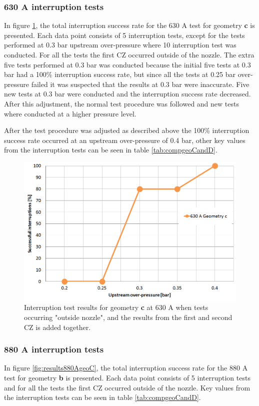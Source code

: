 \documentclass[10pt,b5paper,twoside]{article}
\begin{document}
\subsubsection*{630 A interruption tests}
In figure \ref{fig:results630AgeoC}, the total interruption success rate for the 630 A test for geometry \textbf{c} is presented. Each data point consists of 5 interruption tests, except for the tests performed at 0.3 bar upstream over-pressure where 10 interruption test was conducted. For all the tests the first CZ occurred outside of the nozzle. The extra five tests performed at 0.3 bar was conducted because the initial five tests at 0.3 bar had a 100\% interruption success rate, but since all the tests at 0.25 bar over-pressure failed it was suspected that the results at 0.3 bar were inaccurate. Five new tests at 0.3 bar were conducted and the interruption success rate decreased. After this adjustment, the normal test procedure was followed and new tests where conducted at a higher pressure level.

After the test procedure was adjusted as described above the 100\% interruption success rate occurred at an upstream over-pressure of 0.4 bar, other key values from the interruption tests can be seen in table \ref{tab:compgeoCandD}.

\begin{figure}[H]
\centering
\includegraphics[scale=0.45]{Bilder/Results/geoC630amp.PNG}
\caption{Interruption test results for geometry \textbf{c} at 630 A when tests occurring "outside nozzle", and the results from the first and second CZ is added together.} \label{fig:results630AgeoC}
\end{figure}

\subsubsection*{880 A interruption tests}
In figure \ref{fig:results880AgeoC}, the total interruption success rate for the 880 A test for geometry \textbf{b} is presented. Each data point consists of 5 interruption tests and for all the tests the first CZ occurred outside of the nozzle. Key values from the interruption tests can be seen in table \ref{tab:compgeoCandD}. 
\end{document}
